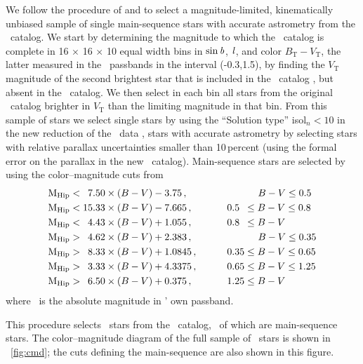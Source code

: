 We follow the procedure of \citet{1998MNRAS.298..387D}
and \citet{Aumer09a} to select a magnitude-limited, kinematically
unbiased sample of single main-sequence stars with accurate astrometry
from the \Hipparcos\ catalog. We start by determining the magnitude to
which the
\Hipparcos\ catalog is complete in 16 $\times$ 16 $\times$ 10 equal
width bins in $\sin {\it b}$, ${\it l}$, and color $B_\mathrm{T} -
V_\mathrm{T}$, the latter measured in the \Tycho\ passbands in the
interval (-0.3,1.5), by finding the $V_\mathrm{T}$ magnitude of the
second brightest star that is included in the \Tycho\ catalog
\citep{hog00a,hog00b}, but absent in the \Hipparcos\ catalog. We then
select in each bin all stars from the original \Hipparcos\ catalog
\citep{ESA97a} brighter in $V_\mathrm{T}$ than the limiting magnitude
in that bin. From this sample of stars we select single stars by using
the ``Solution type'' isol$_{n} < 10$ in the new reduction of the
\Hipparcos\ data \citep{2007ASSL..250.....V}, stars with accurate astrometry
by selecting stars with relative parallax uncertainties smaller than
10\,percent (using the formal error on the parallax in the new
\Hipparcos\ catalog). Main-sequence stars are selected by using the
color--magnitude cuts from \citet{Aumer09a}
\begin{equation}
\begin{split}
\mathrm{M}_{\mathrm{Hip}} &< \phantom{1}7.50\times ( B-V) -3.75\,,\phantom{11}\qquad \qquad \ \ \ \ \ \ \, B-V \leq 0.5\\
\mathrm{M}_{\mathrm{Hip}} &< 15.33 \times (B-V) -7.665\,,\phantom{1}\qquad \quad 0.5\phantom{1} \leq B-V \leq 0.8\\
\mathrm{M}_{\mathrm{Hip}} &< \phantom{1}4.43 \times (B-V) +1.055\,,\phantom{1}\qquad \quad 0.8\phantom{1} \leq B-V\\
\mathrm{M}_{\mathrm{Hip}} &> \phantom{1}4.62 \times (B-V) +2.383\,,\phantom{1}\qquad \qquad \ \ \ \ \ \ \, B-V \leq 0.35\\\label{eq:cmdcuts}
\mathrm{M}_{\mathrm{Hip}} &> \phantom{1}8.33 \times (B-V) +1.0845\,,\qquad \quad 0.35 \leq B-V \leq 0.65\\
\mathrm{M}_{\mathrm{Hip}} &> \phantom{1}3.33 \times (B-V) +4.3375\,,\qquad \quad 0.65 \leq B-V \leq 1.25\\
\mathrm{M}_{\mathrm{Hip}} &> \phantom{1}6.50 \times (B-V) + 0.375\,,\phantom{1}\qquad \quad 1.25 \leq B-V
\end{split}
\end{equation}
where \mhip\ is the absolute magnitude in \Hipparcos' own
passband.

This procedure selects \nstars\ stars from the \Hipparcos\ catalog,
\nstarsms\ of which are main-sequence stars. The color--magnitude
diagram of the full sample of \nstars\ stars is shown in
\figurename~\ref{fig:cmd}; the cuts defining the main-sequence are
also shown in this figure.

